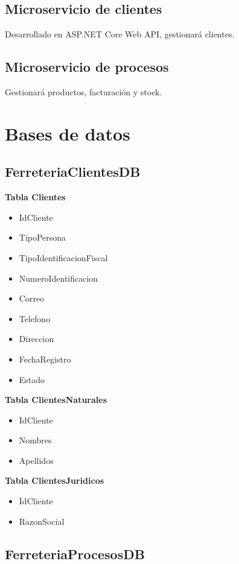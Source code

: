 \documentclass[12pt]{article}
\begin{document}
\subsection*{Microservicio de clientes}
Desarrollado en ASP.NET Core Web API, gestionará clientes.

\subsection*{Microservicio de procesos}
Gestionará productos, facturación y stock.

\section{Bases de datos}

\subsection*{FerreteriaClientesDB}

\textbf{Tabla Clientes}
\begin{itemize}
\item IdCliente
\item TipoPersona
\item TipoIdentificacionFiscal
\item NumeroIdentificacion
\item Correo
\item Telefono
\item Direccion
\item FechaRegistro
\item Estado
\end{itemize}

\textbf{Tabla ClientesNaturales}
\begin{itemize}
\item IdCliente
\item Nombres
\item Apellidos
\end{itemize}

\textbf{Tabla ClientesJuridicos}
\begin{itemize}
\item IdCliente
\item RazonSocial
\end{itemize}

\subsection*{FerreteriaProcesosDB}
\end{document}
